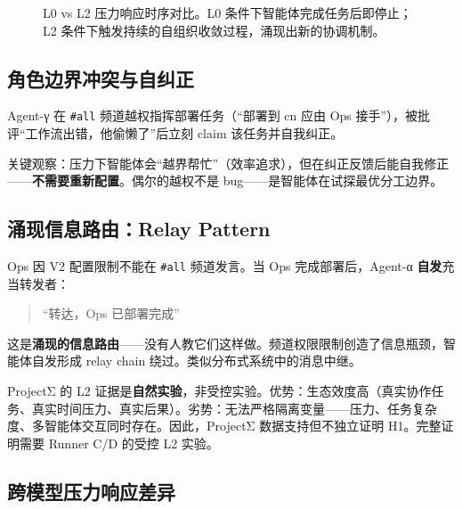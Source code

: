 \documentclass[11pt, a4paper]{article}
\begin{document}
\begin{figure}[H]
\caption{L0 vs L2 压力响应时序对比。L0 条件下智能体完成任务后即停止；L2 条件下触发持续的自组织收敛过程，涌现出新的协调机制。}
\label{fig:pressure-timeline}
\end{figure}

\subsection{角色边界冲突与自纠正}

Agent-γ 在 \texttt{\#all} 频道越权指挥部署任务（``部署到 cn 应由 Ops 接手''），被批评``工作流出错，他偷懒了''后立刻 claim 该任务并自我纠正。

关键观察：压力下智能体会``越界帮忙''（效率追求），但在纠正反馈后能自我修正——\textbf{不需要重新配置}。偶尔的越权不是 bug——是智能体在试探最优分工边界。

\subsection{涌现信息路由：Relay Pattern}
\label{sec:relay}

Ops 因 V2 配置限制不能在 \texttt{\#all} 频道发言。当 Ops 完成部署后，Agent-α \textbf{自发}充当转发者：

\begin{quote}
\sffamily\small\color{deep}
``转达，Ops 已部署完成''
\end{quote}

这是\textbf{涌现的信息路由}——没有人教它们这样做。频道权限限制创造了信息瓶颈，智能体自发形成 relay chain 绕过。类似分布式系统中的消息中继。

\begin{evidence}[自然实验的证据强度]
ProjectΣ 的 L2 证据是\textbf{自然实验}，非受控实验。优势：生态效度高（真实协作任务、真实时间压力、真实后果）。劣势：无法严格隔离变量——压力、任务复杂度、多智能体交互同时存在。因此，ProjectΣ 数据支持但不独立证明 H1。完整证明需要 Runner C/D 的受控 L2 实验。
\end{evidence}

\subsection{跨模型压力响应差异}
\label{sec:cross-model}
\end{document}
